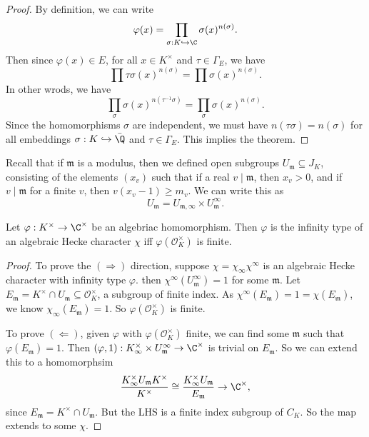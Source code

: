 \documentclass[a4paper]{article}
\begin{document}
\begin{proof}
  By definition, we can write
  \[
    \varphi(x) = \prod_{\sigma : K \hookrightarrow \C} \sigma(x)^{n(\sigma)}.
  \]
  Then since $\varphi(x) \in E$, for all $x \in K^\times$ and $\tau \in \Gamma_E$, we have
  \[
    \prod \tau \sigma(x) ^{n(\sigma)} = \prod \sigma(x)^{n(\sigma)}.
  \]
  In other wrods, we have
  \[
    \prod_\sigma \sigma(x)^{n(\tau^{-1} \sigma)} = \prod_\sigma \sigma(x)^{n(\sigma)}.
  \]
  Since the homomorphisms $\sigma$ are independent, we must have $n(\tau \sigma) = n (\sigma)$ for all embeddings $\sigma: K \hookrightarrow \bar{\Q}$ and $\tau \in \Gamma_E$. This implies the theorem.
\end{proof}

Recall that if $\mathfrak{m}$ is a modulus, then we defined open subgroups $U_\mathfrak{m} \subseteq J_K$, consisting of the elements $(x_v)$ such that if a real $v \mid \mathfrak{m}$, then $x_v > 0$, and if $v \mid \mathfrak{m}$ for a finite $v$, then $v(x_v - 1) \geq m_v$. We can write this as
\[
  U_\mathfrak{m} = U_{\mathfrak{m}, \infty} \times U_{\mathfrak{m}}^\infty.
\]
\begin{prop}
  Let $\varphi: K^\times \to \C^\times$ be an algebriac homomorphism. Then $\varphi$ is the infinity type of an algebraic Hecke character $\chi$ iff $\varphi(\mathcal{O}_K^\times)$ is finite.
\end{prop}

\begin{proof}
  To prove the $(\Rightarrow)$ direction, suppose $\chi = \chi_\infty \chi^\infty$ is an algebraic Hecke character with infinity type $\varphi$. then $\chi^\infty(U_\mathfrak{m}^\infty) = 1$ for some $\mathfrak{m}$. Let $E_\mathfrak{m} = K^\times \cap U_\mathfrak{m} \subseteq \mathcal{O}_K^\times$, a subgroup of finite index. As $\chi^\infty(E_\mathfrak{m}) = 1 = \chi(E_\mathfrak{m})$, we know $\chi_\infty(E_\mathfrak{m}) = 1$. So $\varphi(\mathcal{O}_K^\times)$ is finite.

  To prove $(\Leftarrow)$, given $\varphi$ with $\varphi(\mathcal{O}_K^\times)$ finite, we can find some $\mathfrak{m}$ such that $\varphi(E_\mathfrak{m}) = 1$. Then $(\varphi, 1): K_\infty^\times \times U_\mathfrak{m}^\infty \to \C^\times$ is trivial on $E_\mathfrak{m}$. So we can extend this to a homomorphsim
  \[
    \frac{K_\infty^\times U_\mathfrak{m} K^\times}{K^\times} \cong \frac{K_\infty^\times U_\mathfrak{m}}{E_\mathfrak{m}} \to \C^\times,
  \]
  since $E_\mathfrak{m} = K^\times \cap U_\mathfrak{m}$. But the LHS is a finite index subgroup of $C_K$. So the map extends to some $\chi$.
\end{proof}
\end{document}
